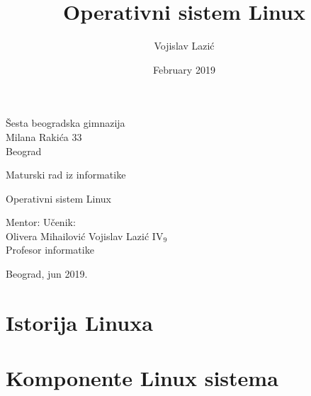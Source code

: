 \documentclass[12pt,twoside,a4paper]{article}
\title{Operativni sistem Linux}
\author{Vojislav Lazić}
\date{February 2019}
\begin{document}
    \thispagestyle{empty}
    \noindent
    Šesta beogradska gimnazija\\
    Milana Rakića 33\\
    Beograd
    \vfill
    \begin{center}
        \begin{Large}
        Maturski rad iz informatike\\
        \bigskip 
        \end{Large}
        {\Huge
        Operativni sistem Linux}
    \end{center}
    \vfill
    \noindent Mentor: \hfill Učenik:\\
    Olivera Mihailović \hfill Vojislav Lazić IV$_{9}$\\
    Profesor informatike
    \vfill
    \begin{center}
        Beograd, jun 2019.
    \end{center}
\thispagestyle{empty}


\newpage
\tableofcontents
\newpage
\section{Istorija Linuxa}

\section{Komponente Linux sistema}


\renewcommand\refname{Literatura}


\end{document}
